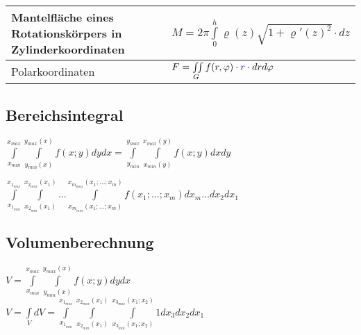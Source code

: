 \begin{tabular}{|p{5.5 cm}|p{10cm}|}
\begin{minipage}{5.5cm}
  		Mantelfläche eines Rotationskörpers in Zylinderkoordinaten    
    \end{minipage}&
	\begin{minipage}{10cm}
    	\vspace{0.1cm}
		$M = 2\pi\int\limits_0^h\varrho(z)\sqrt{1+\varrho'(z)^2}\cdot dz$
    	\vspace{0.1cm}
    \end{minipage}\\
	\hline
	Polarkoordinaten &
	\begin{minipage}{10cm}
    	\vspace{0.1cm}
		$F=\iint\limits_G f(r,\varphi)\cdot \textcolor{blue}{r} \cdot dr d\varphi $
    	\vspace{0.1cm}
    \end{minipage}\\
	\hline
\end{tabular}

\subsection{Bereichsintegral}
\begin{multicols}{2}
  $\boxed{\int\limits_{x_{min}}^{x_{max}}\int\limits_{y_{min}(x)}^{y_{max}(x)}f(x;y) dy dx =
  \int\limits_{y_{min}}^{y_{max}}\int\limits_{x_{min}(y)}^{x_{max}(y)}f(x;y) dx dy }$
  
\columnbreak
  $\boxed{\int\limits_{x_{1_{min}}}^{x_{1_{max}}}\int\limits_{x_{2_{min}}(x_1)}^{x_{2_{max}}(x_1)}\ldots 
  \int\limits_{x_{m_{min}}(x_1;\ldots;x_m)}^{x_{m_{max}}(x_1;\ldots;x_m)}f(x_1;\ldots;x_m)dx_m \ldots dx_2 dx_1}$
  
\end{multicols}


\subsection{Volumenberechnung}
  \begin{multicols}{2}
    $\boxed{V = \int\limits_{x_{min}}^{x_{max}}\int\limits_{y_{min}(x)}^{y_{max}(x)}f(x;y) dy dx}$ \\
    
  \columnbreak
    $\boxed{V = \int\limits_V dV = \int\limits_{x_{1_{min}}}^{x_{1_{max}}}\int\limits_{x_{2_{min}}(x_1)}^{x_{2_{max}}(x_1)}
    \int\limits_{x_{3_{min}}(x_1;x_2)}^{x_{3_{max}}(x_1;x_2)}1 dx_3 dx_2 dx_1}$
  \end{multicols}


